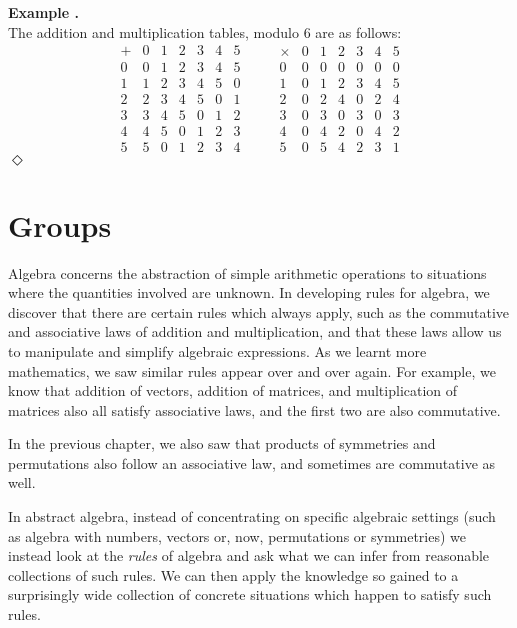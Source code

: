 \documentclass[10pt]{book}
\theoremstyle{break}
\newcounter{example}[section]
\renewcommand{\theexample}{\thesection.\arabic{example}}
\newenvironment{example}[1][]%
{\par\vspace{\theorempreskipamount}\refstepcounter{example}\noindent\textbf{Example
\theexample\ifthenelse{\equal{#1}{}}{}{
(#1)}}\\\hspace*{\parindent}}%
{\hfill$\Diamond$\par\vspace{\theorempostskipamount}}
\begin{document}
\begin{example}\label{eg:mod6}
  The addition and multiplication tables, modulo 6 are as follows:
  \[
    \begin{array}{c|cccccc}
      + & 0 & 1 & 2 & 3 & 4 & 5 \\
      \hline
      0 & 0 & 1 & 2 & 3 & 4 & 5 \\
      1 & 1 & 2 & 3 & 4 & 5 & 0 \\
      2 & 2 & 3 & 4 & 5 & 0 & 1 \\
      3 & 3 & 4 & 5 & 0 & 1 & 2 \\
      4 & 4 & 5 & 0 & 1 & 2 & 3 \\
      5 & 5 & 0 & 1 & 2 & 3 & 4
    \end{array}
  \qquad
    \begin{array}{c|cccccc}
      \times & 0 & 1 & 2 & 3 & 4 & 5 \\
      \hline
      0 & 0 & 0 & 0 & 0 & 0 & 0 \\
      1 & 0 & 1 & 2 & 3 & 4 & 5 \\
      2 & 0 & 2 & 4 & 0 & 2 & 4 \\
      3 & 0 & 3 & 0 & 3 & 0 & 3 \\
      4 & 0 & 4 & 2 & 0 & 4 & 2 \\
      5 & 0 & 5 & 4 & 2 & 3 & 1
    \end{array}
  \]
\end{example}


\chapter{Groups}

Algebra concerns the abstraction of simple arithmetic operations to
situations where the quantities involved are unknown.  In developing rules
for algebra, we discover that there are certain rules which always apply,
such as the commutative and associative laws of addition and multiplication,
and that these laws allow us to manipulate and simplify algebraic
expressions. As we learnt more mathematics, we saw similar rules appear over
and over again.  For example, we know that addition of vectors, addition of
matrices, and multiplication of matrices also all satisfy associative laws, and
the first two are also commutative.

In the previous chapter, we also saw that products of symmetries and
permutations also follow an associative law, and sometimes are commutative as
well.

In abstract algebra, instead of concentrating on specific algebraic
settings (such as algebra with numbers, vectors or, now, permutations or
symmetries) we instead look
at the \emph{rules} of algebra and ask what we can infer from reasonable
collections of such rules.  We can then apply the knowledge so gained to a
surprisingly wide collection of concrete situations which happen to satisfy
such rules.
\end{document}
